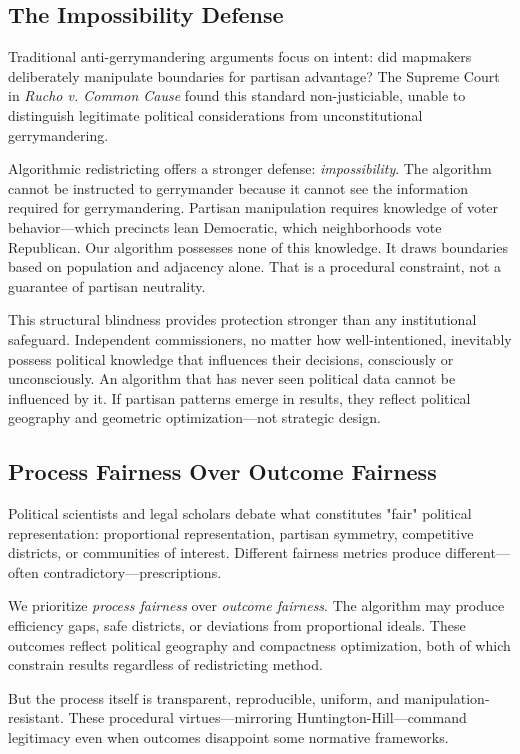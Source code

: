 \subsection{The Impossibility Defense}

Traditional anti-gerrymandering arguments focus on intent: did mapmakers deliberately manipulate boundaries for partisan advantage? The Supreme Court in \textit{Rucho v. Common Cause} found this standard non-justiciable, unable to distinguish legitimate political considerations from unconstitutional gerrymandering.

Algorithmic redistricting offers a stronger defense: \textit{impossibility}. The algorithm cannot be instructed to gerrymander because it cannot see the information required for gerrymandering. Partisan manipulation requires knowledge of voter behavior—which precincts lean Democratic, which neighborhoods vote Republican. Our algorithm possesses none of this knowledge. It draws boundaries based on population and adjacency alone. That is a procedural constraint, not a guarantee of partisan neutrality.

This structural blindness provides protection stronger than any institutional safeguard. Independent commissioners, no matter how well-intentioned, inevitably possess political knowledge that influences their decisions, consciously or unconsciously. An algorithm that has never seen political data cannot be influenced by it. If partisan patterns emerge in results, they reflect political geography and geometric optimization—not strategic design.

\subsection{Process Fairness Over Outcome Fairness}

Political scientists and legal scholars debate what constitutes "fair" political representation: proportional representation, partisan symmetry, competitive districts, or communities of interest. Different fairness metrics produce different—often contradictory—prescriptions.

We prioritize \textit{process fairness} over \textit{outcome fairness}. The algorithm may produce efficiency gaps, safe districts, or deviations from proportional ideals. These outcomes reflect political geography and compactness optimization, both of which constrain results regardless of redistricting method.

But the process itself is transparent, reproducible, uniform, and manipulation-resistant. These procedural virtues—mirroring Huntington-Hill—command legitimacy even when outcomes disappoint some normative frameworks.

